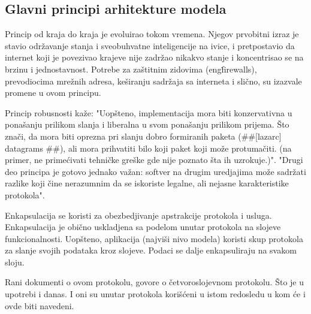 \documentclass[a4paper,12pt, master]{etf}
\begin{document}
	\subsection{Glavni principi arhitekture modela}

	Princip od kraja do kraja je evoluirao tokom vremena. Njegov prvobitni
	izraz je stavio	odr\v{z}avanje stanja i sveobuhvatne inteligencije na ivice,
	 i pretpostavio da internet koji je	povezivao krajeve nije zadr\v{z}ao
	nikakvo stanje i koncentrisao se na brzinu i jednostavnost. Potrebe za
	za\v{s}titnim zidovima (eng\. firewalls), prevodiocima mre\v{z}nih adresa,
    ke\v{s}iranju sadr\v{z}aja sa interneta i sli\v{c}no, su izazvale promene u
    ovom principu.

	Princip robusnosti ka\v{z}e: "Uop\v{s}teno, implementacija mora biti
	konzervativna u pona\v{s}anju prilikom slanja i liberalna u svom
	pona\v{s}anju prilikom prijema. \v{S}to zna\v{c}i, da mora biti
	oprezna pri slanju dobro formiranih paketa (\#\#[lazarc] datagrams \#\#),
	ali mora prihvatiti bilo koji paket koji mo\v{z}e protuma\v{c}iti. (na
	primer, ne prime\'{c}ivati tehni\v{c}ke gre\v{s}ke gde nije poznato \v{s}ta
	ih uzrokuje.)". "Drugi deo principa je gotovo jednako va\v{z}an: softver na
	drugim uredjajima mo\v{z}e sadr\v{z}ati razlike koji \v{c}ine nerazumnim da
	se iskoriste legalne, ali nejasne karakteristike protokola".

	Enkapsulacija se koristi za obezbedjivanje apstrakcije protokola i usluga.
	Enkapsulacija je obi\v{c}no uskladjena sa podelom unutar protokola na
	slojeve funkcionalnosti. Uop\v{s}teno, aplikacija (najvi\v{s}i nivo modela)
	koristi skup protokola za slanje svojih podataka kroz slojeve. Podaci se
	dalje enkapsuliraju na svakom sloju.

	Rani dokumenti o ovom protokolu, govore o \v{c}etvoroslojevnom protokolu.
	\v{S}to je u upotrebi i	danas. I oni su unutar protokola kori\v{s}\'{c}eni
	u istom redosledu u kom \'{c}e i ovde biti navedeni.
\end{document}
